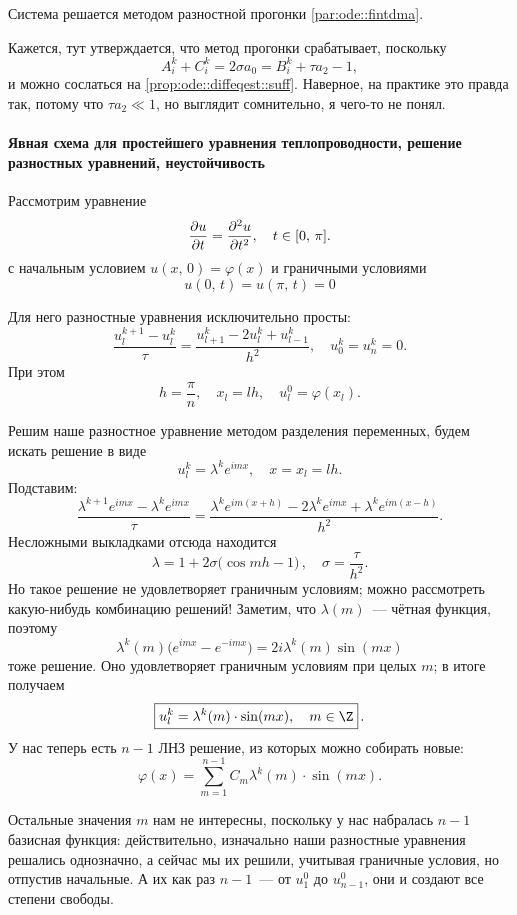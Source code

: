 \documentclass{trlnotes}
\begin{document}
Система решается методом разностной прогонки \ref{par:ode::fintdma}.

Кажется, тут утверждается, что метод прогонки срабатывает, поскольку
\[
	A_i^k + C_i^k = 2\sigma a_0 = B_i^k + \tau a_2 - 1,
\]
и можно сослаться на \ref{prop:ode::diffeqest::suff}. Наверное, на практике это правда так, потому что $\tau a_2 \ll 1$, но выглядит сомнительно, я чего-то не понял.

\paragraph{Явная схема для простейшего уравнения теплопроводности, решение разностных уравнений, неустойчивость}

Рассмотрим уравнение
\[
	\dfrac{\partial u}{\partial t} = \dfrac{\partial^2 u}{\partial t^2}, \quad t \in [0, \, \pi].
\]
с начальным условием $u(x, \, 0) = \varphi(x)$ и граничными условиями
\[
	u(0, \, t) = u(\pi, \, t) = 0
\]

Для него разностные уравнения исключительно просты:
\[
	\dfrac{u^{k + 1}_l - u^k_l}{\tau} = \dfrac{u^k_{l + 1} - 2u^k_l + u^k_{l-1}}{h^2}, \quad u_0^k = u_n^k = 0.
\]
При этом
\[
	h = \dfrac{\pi}{n}, \quad x_l = lh, \quad u_l^0 = \varphi(x_l).
\]

Решим наше разностное уравнение методом разделения переменных, будем искать решение в виде
\[
	u_l^k = \lambda^k e^{imx}, \quad x = x_l = lh.
\]
Подставим:
\[
	\dfrac{\lambda^{k + 1}e^{imx} - \lambda^{k}e^{imx}}{\tau} = \dfrac{\lambda^k e^{im(x+h)} - 2\lambda^k e^{imx} + \lambda^k e^{im(x-h)}}{h^2}.
\]
Несложными выкладками отсюда находится
\[
	\lambda = 1 + 2\sigma \big(\cos mh - 1\big)\,, \quad \sigma = \dfrac{\tau}{h^2}.
\]
Но такое решение не удовлетворяет граничным условиям; можно рассмотреть какую-нибудь комбинацию решений! Заметим, что $\lambda(m)$~--- чётная функция, поэтому 
\[
	\lambda^k(m) \big(e^{imx} - e^{-imx}\big) = 2i\lambda^k(m)\sin(mx)
\]
тоже решение. Оно удовлетворяет граничным условиям при целых $m$; в итоге получаем
\[
	\boxed{u_l^k = \lambda^k(m) \cdot \sin (mx), \quad m \in \Z}\,.
\]
У нас теперь есть $n-1$ ЛНЗ решение, из которых можно собирать новые:
\[
	\varphi(x) = \sum\limits_{m = 1}^{n - 1} C_m \lambda^k(m) \cdot \sin (mx).
\]

\begin{rem}
	Остальные значения $m$ нам не интересны, поскольку у нас набралась $n-1$ базисная функция: действительно, изначально наши разностные уравнения решались однозначно, а сейчас мы их решили, учитывая граничные условия, но отпустив начальные. А их как раз $n - 1$~--- от $u^0_1$ до $u^0_{n-1}$, они и создают все степени свободы.
\end{rem}
\end{document}
